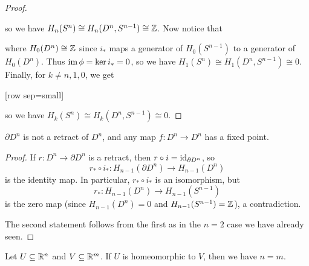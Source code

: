 \begin{proof}
\begin{center}
  \end{center}
  so we have
  $H_n(S^n) \cong H_{n}(D^n, S^{n - 1}) \cong \mathbb{Z}$.
  Now notice that
  \begin{center}
  \end{center}
  where $H_0(D^n) \cong \mathbb{Z}$ since $i_*$ maps a
  generator of $H_0(S^{n - 1})$ to a generator of
  $H_0(D^n)$. Thus $\operatorname{im} \phi = \ker i_* = 0$, so we have
  $H_1(S^n) \cong H_1(D^n, S^{n - 1}) \cong 0$.
  Finally, for $k \ne n, 1, 0$, we get
  \begin{center}[row sep=small]
  \end{center}
  so we have $H_k(S^n) \cong H_k(D^n, S^{n - 1}) \cong 0$.
\end{proof}

\begin{corollary}
  $\partial D^n$ is not a retract of $D^n$, and
  any map $f : D^n \to D^n$ has a fixed point.
\end{corollary}

\begin{proof}
  If $r : D^n \to \partial D^n$ is a retract, then
  $r \circ i = \operatorname{id}_{\partial D^n}$, so
  \[
    r_* \circ i_* : H_{n - 1}(\partial D^n) \to H_{n - 1}(D^n)
  \]
  is the identity map. In particular, $r_* \circ i_*$
  is an isomorphism, but
  \[
    r_* : H_{n - 1}(D^n) \to H_{n - 1}(S^{n - 1})
  \]
  is the zero map
  (since $H_{n - 1}(D^n) = 0$ and
  $H_{n - 1}(S^{n - 1}) = \mathbb{Z}$), a contradiction.

  The second statement follows from the first as
  in the $n = 2$ case we have already seen.
\end{proof}

\begin{corollary}
  Let $U \subseteq \mathbb{R}^n$ and $V \subseteq \mathbb{R}^m$.
  If $U$ is homeomorphic to $V$, then we have $n = m$.
\end{corollary}

